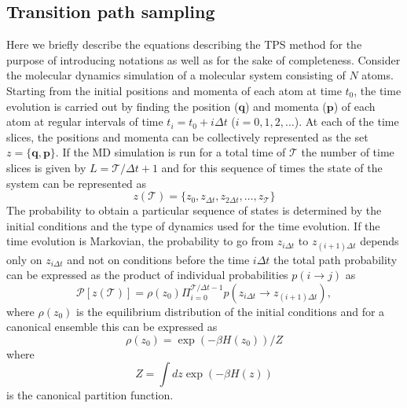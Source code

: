 \documentclass[journal=jpcbfk,manuscript=article,layout=traditional]{achemso}
\begin{document}
\subsection{Transition path sampling}
Here we briefly describe the equations describing the TPS method for the purpose of
introducing notations as well as for the sake of completeness. 
Consider the molecular dynamics simulation of a molecular system consisting 
of $N$ atoms. Starting from the initial positions and momenta of each atom at time $t_0$,
the time evolution is carried out by finding the position ($\textbf{q}$) and 
momenta ($\textbf{p}$) of each atom at regular intervals of time $t_i = t_0 + i\Delta t$  
($i = 0,1,2,\ldots$). At each of the time slices, the positions and 
momenta can be collectively represented as
the set $z = \{\textbf{q},\textbf{p}\}$. If the MD simulation is 
run for a total 
time of $\mathcal{T}$ the number of time slices is given by 
$L = \mathcal{T}/\Delta t +1$ and for this sequence of 
times the state of the system can be represented as 
\begin{equation}
z(\mathcal{T}) = \{z_0, z_{\Delta t}, z_{2\Delta t},\ldots,z_{\mathcal{T}}\}
\end{equation}
The probability to obtain a particular sequence of states is determined by the initial 
conditions and the type of dynamics used for the time evolution. If the time evolution is 
Markovian, the probability to go from $z_{i\Delta t}$ to $z_{(i+1)\Delta t}$ depends only 
on $z_{i\Delta t}$ and not on conditions before the time $i\Delta t$ the total path probability can 
be expressed as the product of individual probabilities $p(i\rightarrow j)$ as 
\begin{equation}
\mathcal{P}[z(\mathcal{T})] = \rho(z_0)\Pi_{i=0}^{\mathcal{T}/\Delta t-1} p(z_{i\Delta t}\rightarrow z_{(i+1)\Delta t}),
\end{equation}
where $\rho(z_0)$ is the equilibrium distribution of the initial conditions and for a canonical ensemble this can be 
expressed as 
\begin{equation}
\rho(z_0) = \exp(-\beta H(z_0))/Z
\end{equation}
where 
\begin{equation}
Z = \int dz \exp(-\beta H(z)) 
\end{equation}
is the canonical partition function. 
\end{document}

